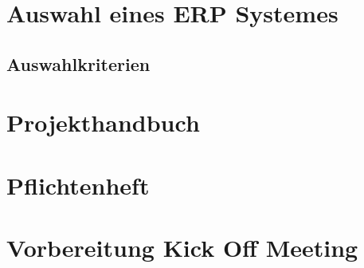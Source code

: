 \documentclass[12pt]{article}
\begin{document}
\section{Auswahl eines ERP Systemes}
\subsection{Auswahlkriterien}

\section*{Projekthandbuch}
\section*{Pflichtenheft}
\section*{Vorbereitung Kick Off Meeting}




\newpage
\listoftables
\listoffigures
\end{document}
